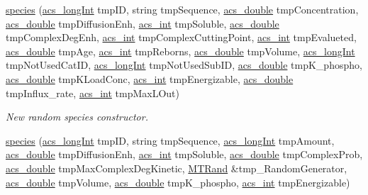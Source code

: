 \begin{DoxyCompactItemize}
\hyperlink{a00022_a26eba3e8d86938ad8b2b6b284e9f010f}{species} (\hyperlink{a00050_a19319d75f02db4308bc5c0026d98cd85}{acs\-\_\-long\-Int} tmp\-I\-D, string tmp\-Sequence, \hyperlink{a00050_ab776853a005fcbf56af0424a2a4dd607}{acs\-\_\-double} tmp\-Concentration, \hyperlink{a00050_ab776853a005fcbf56af0424a2a4dd607}{acs\-\_\-double} tmp\-Diffusion\-Enh, \hyperlink{a00050_a8d277355641a098190360234e2ebde35}{acs\-\_\-int} tmp\-Soluble, \hyperlink{a00050_ab776853a005fcbf56af0424a2a4dd607}{acs\-\_\-double} tmp\-Complex\-Deg\-Enh, \hyperlink{a00050_a8d277355641a098190360234e2ebde35}{acs\-\_\-int} tmp\-Complex\-Cutting\-Point, \hyperlink{a00050_a8d277355641a098190360234e2ebde35}{acs\-\_\-int} tmp\-Evalueted, \hyperlink{a00050_ab776853a005fcbf56af0424a2a4dd607}{acs\-\_\-double} tmp\-Age, \hyperlink{a00050_a8d277355641a098190360234e2ebde35}{acs\-\_\-int} tmp\-Reborns, \hyperlink{a00050_ab776853a005fcbf56af0424a2a4dd607}{acs\-\_\-double} tmp\-Volume, \hyperlink{a00050_a19319d75f02db4308bc5c0026d98cd85}{acs\-\_\-long\-Int} tmp\-Not\-Used\-Cat\-I\-D, \hyperlink{a00050_a19319d75f02db4308bc5c0026d98cd85}{acs\-\_\-long\-Int} tmp\-Not\-Used\-Sub\-I\-D, \hyperlink{a00050_ab776853a005fcbf56af0424a2a4dd607}{acs\-\_\-double} tmp\-K\-\_\-phospho, \hyperlink{a00050_ab776853a005fcbf56af0424a2a4dd607}{acs\-\_\-double} tmp\-K\-Load\-Conc, \hyperlink{a00050_a8d277355641a098190360234e2ebde35}{acs\-\_\-int} tmp\-Energizable, \hyperlink{a00050_ab776853a005fcbf56af0424a2a4dd607}{acs\-\_\-double} tmp\-Influx\-\_\-rate, \hyperlink{a00050_a8d277355641a098190360234e2ebde35}{acs\-\_\-int} tmp\-Max\-L\-Out)
\begin{DoxyCompactList}\small\item\em New random species constructor. \end{DoxyCompactList}\item 
\hyperlink{a00022_a59cb623199b038029a7d63a720408cf5}{species} (\hyperlink{a00050_a19319d75f02db4308bc5c0026d98cd85}{acs\-\_\-long\-Int} tmp\-I\-D, string tmp\-Sequence, \hyperlink{a00050_a19319d75f02db4308bc5c0026d98cd85}{acs\-\_\-long\-Int} tmp\-Amount, \hyperlink{a00050_ab776853a005fcbf56af0424a2a4dd607}{acs\-\_\-double} tmp\-Diffusion\-Enh, \hyperlink{a00050_a8d277355641a098190360234e2ebde35}{acs\-\_\-int} tmp\-Soluble, \hyperlink{a00050_ab776853a005fcbf56af0424a2a4dd607}{acs\-\_\-double} tmp\-Complex\-Prob, \hyperlink{a00050_ab776853a005fcbf56af0424a2a4dd607}{acs\-\_\-double} tmp\-Max\-Complex\-Deg\-Kinetic, \hyperlink{a00016}{M\-T\-Rand} \&tmp\-\_\-\-Random\-Generator, \hyperlink{a00050_ab776853a005fcbf56af0424a2a4dd607}{acs\-\_\-double} tmp\-Volume, \hyperlink{a00050_ab776853a005fcbf56af0424a2a4dd607}{acs\-\_\-double} tmp\-K\-\_\-phospho, \hyperlink{a00050_a8d277355641a098190360234e2ebde35}{acs\-\_\-int} tmp\-Energizable)

\end{DoxyCompactItemize}
